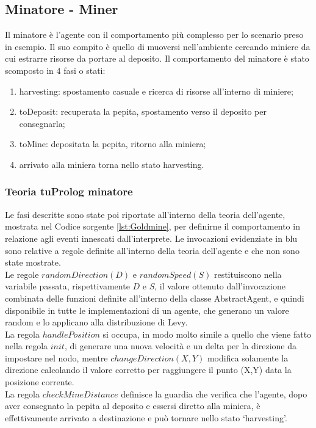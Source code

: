 \subsection{Minatore - Miner}
Il minatore è l'agente con il comportamento più complesso per lo scenario preso in esempio.
Il suo compito è quello di muoversi nell'ambiente cercando miniere da cui estrarre risorse da portare al deposito.
Il comportamento del minatore è stato scomposto in 4 fasi o stati:
\begin{enumerate}
\item harvesting: spostamento casuale e ricerca di risorse all'interno di miniere;
\item toDeposit: recuperata la pepita, spostamento verso il deposito per consegnarla;
\item toMine: depositata la pepita, ritorno alla miniera;
\item arrivato alla miniera torna nello stato harvesting.
\end{enumerate}

\subsubsection{Teoria tuProlog minatore}
Le fasi descritte sono state poi riportate all'interno della teoria dell'agente, mostrata nel Codice sorgente \ref{lst:Goldmine}, per definirne il comportamento in relazione agli eventi innescati dall'interprete. Le invocazioni evidenziate in blu sono relative a regole definite all'interno della teoria dell'agente e che non sono state mostrate.
\\
Le regole $ randomDirection(D)$ e $randomSpeed(S)$ restituiscono nella variabile passata, rispettivamente $D$ e $S$, il valore ottenuto dall'invocazione combinata delle funzioni definite all'interno della classe AbstractAgent, e quindi disponibile in tutte le implementazioni di un agente, che generano un valore random e lo applicano alla distribuzione di Levy.
\\
La regola $handlePosition$ si occupa, in modo molto simile a quello che viene fatto nella regola $init$, di generare una nuova velocità e un delta per la direzione da impostare nel nodo, mentre $changeDirection(X,Y)$ modifica solamente la direzione calcolando il valore corretto per raggiungere il punto (X,Y) data la posizione corrente.
\\
La regola $checkMineDistance$ definisce la guardia che verifica che l'agente, dopo aver consegnato la pepita al deposito e essersi diretto alla miniera, è effettivamente arrivato a destinazione e può tornare nello stato `harvesting'.
 
